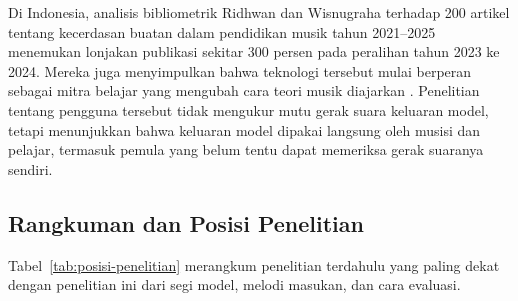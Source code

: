 Di Indonesia, analisis bibliometrik Ridhwan dan Wisnugraha terhadap 200 artikel tentang kecerdasan buatan dalam pendidikan musik tahun 2021--2025 menemukan lonjakan publikasi sekitar 300 persen pada peralihan tahun 2023 ke 2024. Mereka juga menyimpulkan bahwa teknologi tersebut mulai berperan sebagai mitra belajar yang mengubah cara teori musik diajarkan \parencite[81]{ridhwan2026}. Penelitian tentang pengguna tersebut tidak mengukur mutu gerak suara keluaran model, tetapi menunjukkan bahwa keluaran model dipakai langsung oleh musisi dan pelajar, termasuk pemula yang belum tentu dapat memeriksa gerak suaranya sendiri.

\subsection{Rangkuman dan Posisi Penelitian}\label{sec:posisi-penelitian}

Tabel~\ref{tab:posisi-penelitian} merangkum penelitian terdahulu yang paling dekat dengan penelitian ini dari segi model, melodi masukan, dan cara evaluasi.

